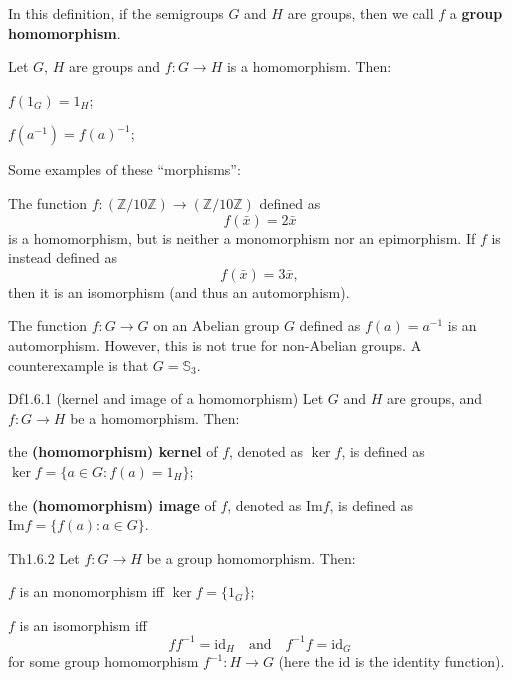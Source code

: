 \documentclass{article}
\begin{document}
\begin{Rmk}{}
    \textcolor{Df}{In this definition, if the semigroups $G$ and $H$ are groups, then we call $f$ a \textbf{group homomorphism}.}
    \textcolor{Th}{Let $G$, $H$ are groups and $f: G\to H$ is a homomorphism. Then:
    \begin{compactenum}
        \item $f(1_G) = 1_H$;
        \item $f(a^{-1}) = f(a)^{-1}$;
    \end{compactenum}}
    \textcolor{Th}{Some examples of these ``morphisms'':
    \begin{compactenum}
        \item The function $f: (\mathbb{Z}/10\mathbb{Z})\to (\mathbb{Z}/10\mathbb{Z})$ defined as
        $$ f(\bar{x}) = 2\bar{x} $$
        is a homomorphism, but is neither a monomorphism nor an epimorphism. If $f$ is instead defined as
        $$ f(\bar{x}) = 3\bar{x}, $$
        then it is an isomorphism (and thus an automorphism).
        \item The function $f: G\to G$ on an Abelian group $G$ defined as $f(a) = a^{-1}$ is an automorphism. However, this is not true for non-Abelian groups. A counterexample is that $G = \mathbb{S}_3$.
    \end{compactenum}}
\end{Rmk}

\begin{Df}{Df1.6.1 (kernel and image of a homomorphism)}
    Let $G$ and $H$ are groups, and $f: G\to H$ be a homomorphism. Then:
    \begin{compactenum}
        \item the \textbf{(homomorphism) kernel} of $f$, denoted as $\ker f$, is defined as $\ker f = \{a\in G: f(a) = 1_H\}$;
        \item the \textbf{(homomorphism) image} of $f$, denoted as $\mathrm{Im} f$, is defined as $\mathrm{Im} f = \{f(a): a\in G\}$.
    \end{compactenum}
\end{Df}

\begin{Th}{Th1.6.2}
    Let $f: G\to H$ be a group homomorphism. Then:
    \begin{compactenum}
        \item $f$ is an monomorphism iff $\ker f = \{1_G\}$;
        \item $f$ is an isomorphism iff 
        $$ ff^{-1} = \mathrm{id}_H \quad \text{and} \quad f^{-1}f = \mathrm{id}_G $$
        for some group homomorphism $f^{-1}: H\to G$ (here the $\mathrm{id}$ is the identity function).
    \end{compactenum}
\end{Th}
\end{document}
